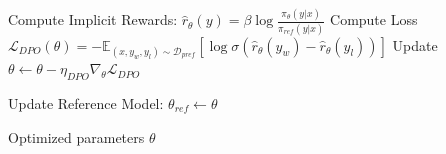 \documentclass{article}
\theoremstyle{plain}
\theoremstyle{definition}
\theoremstyle{remark}
\begin{document}
\begin{algorithm}[h]
\begin{algorithmic}[1]
       \STATE {}
       \STATE Compute Implicit Rewards: $\hat{r}_\theta(y) = \beta \log \frac{\pi_\theta(y|x)}{\pi_{ref}(y|x)}$
       \STATE Compute Loss $\mathcal{L}_{DPO}(\theta) = - \mathbb{E}_{(x,y_w,y_l) \sim \mathcal{D}_{pref}} \left[ \log \sigma \left( \hat{r}_\theta(y_w) - \hat{r}_\theta(y_l) \right) \right]$
       \STATE Update $\theta \leftarrow \theta - \eta_{DPO} \nabla_\theta \mathcal{L}_{DPO}$
       
       \STATE {}
           \STATE Update Reference Model: $\theta_{ref} \leftarrow \theta$
       \ENDIF
   \ENDFOR
   
    Optimized parameters $\theta$
\end{algorithmic}
\end{algorithm}
\end{document}
